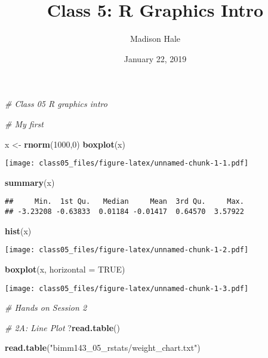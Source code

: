 \documentclass[]{article}
\title{Class 5: R Graphics Intro}
\author{Madison Hale}
\date{January 22, 2019}
\newenvironment{Shaded}{\begin{snugshade}}{\end{snugshade}}
\newcommand{\KeywordTok}[1]{\textcolor[rgb]{0.13,0.29,0.53}{\textbf{#1}}}
\newcommand{\DataTypeTok}[1]{\textcolor[rgb]{0.13,0.29,0.53}{#1}}
\newcommand{\DecValTok}[1]{\textcolor[rgb]{0.00,0.00,0.81}{#1}}
\newcommand{\StringTok}[1]{\textcolor[rgb]{0.31,0.60,0.02}{#1}}
\newcommand{\CommentTok}[1]{\textcolor[rgb]{0.56,0.35,0.01}{\textit{#1}}}
\newcommand{\OtherTok}[1]{\textcolor[rgb]{0.56,0.35,0.01}{#1}}
\newcommand{\NormalTok}[1]{#1}
\begin{document}
\maketitle

\begin{Shaded}
\begin{Highlighting}[]
\CommentTok{# Class 05 R graphics intro}

\CommentTok{# My first }

\NormalTok{x <-}\StringTok{  }\KeywordTok{rnorm}\NormalTok{(}\DecValTok{1000}\NormalTok{,}\DecValTok{0}\NormalTok{)}
\KeywordTok{boxplot}\NormalTok{(x) }
\end{Highlighting}
\end{Shaded}

\texttt{[image: class05\_files/figure-latex/unnamed-chunk-1-1.pdf]}

\begin{Shaded}
\begin{Highlighting}[]
\KeywordTok{summary}\NormalTok{(x)}
\end{Highlighting}
\end{Shaded}

\begin{verbatim}
##     Min.  1st Qu.   Median     Mean  3rd Qu.     Max. 
## -3.23208 -0.63833  0.01184 -0.01417  0.64570  3.57922
\end{verbatim}

\begin{Shaded}
\begin{Highlighting}[]
\KeywordTok{hist}\NormalTok{(x)}
\end{Highlighting}
\end{Shaded}

\texttt{[image: class05\_files/figure-latex/unnamed-chunk-1-2.pdf]}

\begin{Shaded}
\begin{Highlighting}[]
\KeywordTok{boxplot}\NormalTok{(x, }\DataTypeTok{horizontal =} \OtherTok{TRUE}\NormalTok{)}
\end{Highlighting}
\end{Shaded}

\texttt{[image: class05\_files/figure-latex/unnamed-chunk-1-3.pdf]}

\begin{Shaded}
\begin{Highlighting}[]
\CommentTok{# Hands on Session 2}

\CommentTok{# 2A: Line Plot}
\NormalTok{?}\KeywordTok{read.table}\NormalTok{()}

\KeywordTok{read.table}\NormalTok{(}\StringTok{"bimm143_05_rstats/weight_chart.txt"}\NormalTok{)}
\end{Highlighting}
\end{Shaded}
\end{document}
